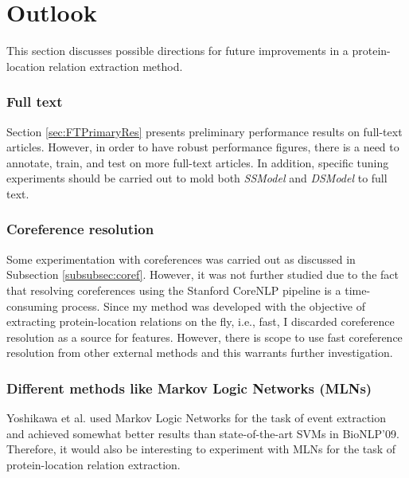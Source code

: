 \chapter{Outlook}\label{chapter:outlook}

This section discusses possible directions for future improvements in a protein-location relation extraction method.

\subsection{Full text}

Section \ref{sec:FTPrimaryRes} presents preliminary performance results on full-text articles. However, in order to have robust performance figures, there is a need to annotate, train, and test on more full-text articles. In addition, specific tuning experiments should be carried out to mold both \textit{SSModel} and \textit{DSModel} to full text.

\subsection{Coreference resolution}

Some experimentation with coreferences was carried out as discussed in Subsection \ref{subsubsec:coref}. However, it was not further studied due to the fact that resolving coreferences using the Stanford CoreNLP pipeline \cite{manning2014stanford} is a time-consuming process. Since my method was developed with the objective of extracting protein-location relations on the fly, i.e., fast, I discarded coreference resolution as a source for features. However, there is scope to use fast coreference resolution from other external methods and this warrants further investigation.

\subsection{Different methods like Markov Logic Networks (MLNs)}


Yoshikawa et al. used Markov Logic Networks \cite{yoshikawa2011coreference} for the task of event extraction and achieved somewhat better results than state-of-the-art SVMs in BioNLP'09. Therefore, it would also be interesting to experiment with MLNs for the task of protein-location relation extraction.